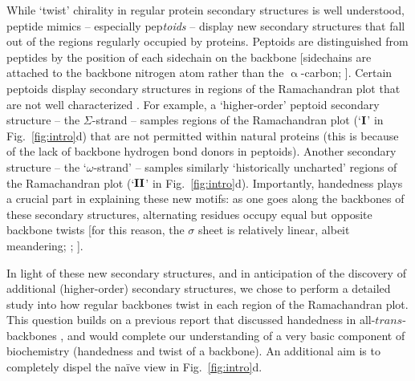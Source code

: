\documentclass[fleqn,10pt]{wlpeerj} %
\newcommand{\Fig}[1]{Fig.~\ref{#1}}
\begin{document}
While `twist' chirality in regular protein secondary structures is well understood, peptide mimics -- especially pep\textit{toids} \citep{Sun2013} -- display new secondary structures that fall out of the regions regularly occupied by proteins. Peptoids are distinguished from peptides by the position of each sidechain on the backbone [sidechains are attached to the backbone nitrogen atom rather than the $\upalpha$-carbon; \cite{Sun2013}]. %
Certain peptoids display secondary structures in regions of the Ramachandran plot that are not well characterized  \citep{Sun2013,Goodman2007,Culf2010,Beke2006,Pohl2012,Zuckermann2009,Sun2013}. For example, a `higher-order' peptoid secondary structure -- the $\Sigma$-strand \citep{Mannige2015,Robertson2016} -- samples regions of the Ramachandran plot (`$\textrm{\textbf{I}}$' in \Fig{fig:intro}d) that are not permitted within natural proteins (this is because of the lack of backbone hydrogen bond donors in peptoids). Another secondary structure -- the `$\omega$-strand' \citep{Gorske2016} -- samples similarly `historically uncharted' regions of the Ramachandran plot (`$\textrm{\textbf{II}}$' in \Fig{fig:intro}d). Importantly, handedness plays a crucial part in explaining these new motifs: as one goes along the backbones of these secondary structures, alternating residues occupy equal but opposite backbone twists [for this reason, the $\sigma$ sheet is relatively linear, albeit meandering; \cite{Mannige2015}; \cite{MannigeKunduWhitelam2016}].

In light of these new secondary structures, and in anticipation of the discovery of additional (higher-order) secondary structures, we chose to perform a detailed study into how regular backbones twist in each region of the Ramachandran plot. This question builds on a previous report that discussed handedness in all-$trans$-backbones \citep{Zacharias2013}, and would complete our understanding of a very basic component of biochemistry (handedness and twist of a backbone). An additional aim is to completely dispel the na{\"i}ve view in \Fig{fig:intro}d.
\end{document}
